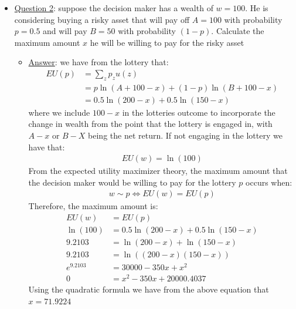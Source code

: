 \documentclass{article}
\begin{document}
  \begin{itemize}
    \item  \underline{Question 2}: suppose the decision maker has a wealth of $w = 100$. He is considering buying a risky asset that will pay off $A = 100$ with probability $p = 0.5$ and will pay $B = 50$ with probability $(1 - p)$. Calculate the maximum amount $x$ he will be willing to pay for the risky asset
    \begin{itemize}
      \item  \underline{Answer}: we have from the lottery that:
      \begin{align*}
        EU(p) &= \sum_{z} p_{z} u(z) \\
        &= p \ln (A + 100 - x) + (1 - p) \ln (B + 100 - x) \\
        &= 0.5 \ln (200 - x) + 0.5 \ln (150 -x)
      \end{align*}
      where we include $100 - x$ in the lotteries outcome to incorporate the change in wealth from the point that the lottery is engaged in, with $A - x$ or $B - X$ being the net return. If not engaging in the lottery we have that:
      \begin{gather*}
        EU(w) = \ln (100)
      \end{gather*}
      From the expected utility maximizer theory, the maximum amount that the decision maker would be willing to pay for the lottery $p$ occurs when:
      \begin{gather*}
        w \sim p \Leftrightarrow EU(w) = EU(p)
      \end{gather*}
      Therefore, the maximum amount is:
      \begin{align*}
        EU(w) &= EU(p) \\
        \ln (100) &= 0.5 \ln (200 - x) + 0.5 \ln (150 - x) \\
        9.2103 &= \ln (200 - x) + \ln (150 - x) \\
        9.2103 &= \ln ((200 - x) (150 - x)) \\
        e^{9.2103} &= 30000 - 350x + x^{2} \\
        0 &= x^{2} - 350x + 20000.4037
      \end{align*}
      Using the quadratic formula we have from the above equation that $x = 71.9224$
    \end{itemize}
  \end{itemize}
\end{document}
